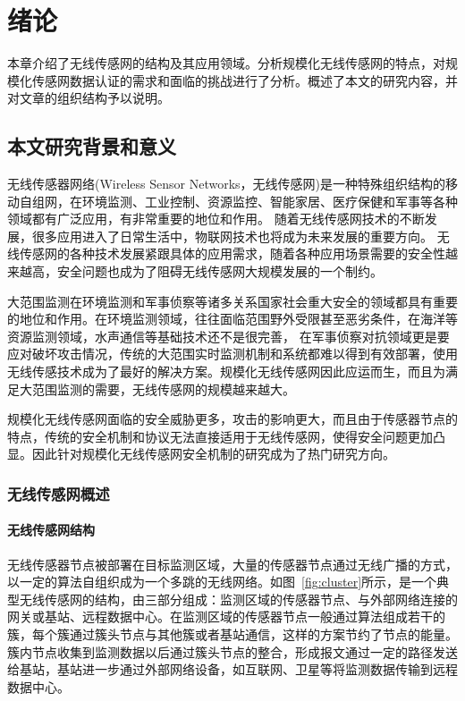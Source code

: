 \chapter{绪论}
本章介绍了无线传感网的结构及其应用领域。分析规模化无线传感网的特点，对规模化传感网数据认证的需求和面临的挑战进行了分析。概述了本文的研究内容，并对文章的组织结构予以说明。
\section{本文研究背景和意义}
无线传感器网络(Wireless Sensor Networks，无线传感网)是一种特殊组织结构的移动自组网，在环境监测、工业控制、资源监控、智能家居、医疗保健和军事等各种领域都有广泛应用，有非常重要的地位和作用。
随着无线传感网技术的不断发展，很多应用进入了日常生活中，物联网技术也将成为未来发展的重要方向。
无线传感网的各种技术发展紧跟具体的应用需求，随着各种应用场景需要的安全性越来越高，安全问题也成为了阻碍无线传感网大规模发展的一个制约。

大范围监测在环境监测和军事侦察等诸多关系国家社会重大安全的领域都具有重要的地位和作用。在环境监测领域，往往面临范围野外受限甚至恶劣条件，在海洋等资源监测领域，水声通信等基础技术还不是很完善， 在军事侦察对抗领域更是要应对破坏攻击情况，传统的大范围实时监测机制和系统都难以得到有效部署，使用无线传感技术成为了最好的解决方案。规模化无线传感网因此应运而生，而且为满足大范围监测的需要，无线传感网的规模越来越大。

规模化无线传感网面临的安全威胁更多，攻击的影响更大，而且由于传感器节点的特点，传统的安全机制和协议无法直接适用于无线传感网，使得安全问题更加凸显。因此针对规模化无线传感网安全机制的研究成为了热门研究方向。

\subsection{无线传感网概述}
\subsubsection{无线传感网结构}
无线传感器节点被部署在目标监测区域，大量的传感器节点通过无线广播的方式，以一定的算法自组织成为一个多跳的无线网络。如图~\ref{fig:cluster}所示，是一个典型无线传感网的结构，由三部分组成：监测区域的传感器节点、与外部网络连接的网关或基站、远程数据中心。在监测区域的传感器节点一般通过算法组成若干的簇，每个簇通过簇头节点与其他簇或者基站通信，这样的方案节约了节点的能量。簇内节点收集到监测数据以后通过簇头节点的整合，形成报文通过一定的路径发送给基站，基站进一步通过外部网络设备，如互联网、卫星等将监测数据传输到远程数据中心。

